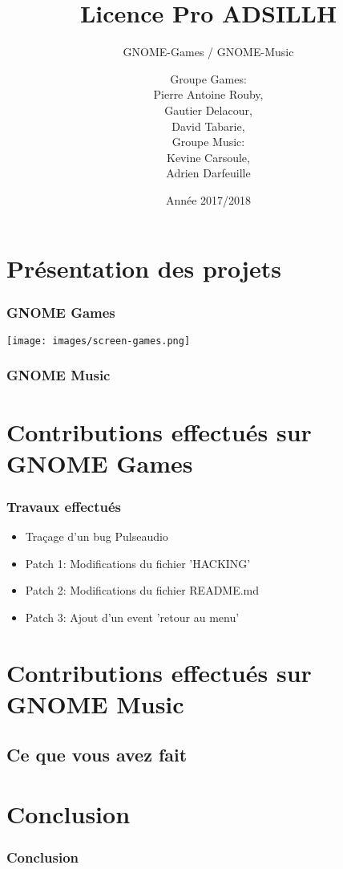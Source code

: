 \documentclass{beamer}
\title{Licence Pro ADSILLH}
\subtitle{GNOME-Games / GNOME-Music}
\author{Groupe Games:\\ Pierre Antoine Rouby,\\ Gautier Delacour,\\
  David Tabarie,\\
  \vspace{0.8cm}
  Groupe Music:\\ Kevine Carsoule,\\ Adrien Darfeuille}
\date{Année 2017/2018}
\begin{document}
\frame{\titlepage}

\section{Présentation des projets}

\begin{frame}
  \frametitle{GNOME Games}
  \texttt{[image: images/screen-games.png]}
\end{frame}

\begin{frame}
  \frametitle{GNOME Music}
\end{frame}

\section{Contributions effectués sur GNOME Games}
\begin{frame}
  \frametitle{Travaux effectués}
  \begin{itemize}
    \item Traçage d'un bug Pulseaudio
    \item Patch 1: Modifications du fichier 'HACKING'
    \item Patch 2: Modifications du fichier README.md
    \item Patch 3: Ajout d'un event 'retour au menu'
  \end{itemize}
\end{frame}

\section{Contributions effectués sur GNOME Music}
\subsection{Ce que vous avez fait}
\begin{frame}
  \frametitle{}
\end{frame}

\section{Conclusion}
\begin{frame}
  \frametitle{Conclusion}
\end{frame}
\end{document}
